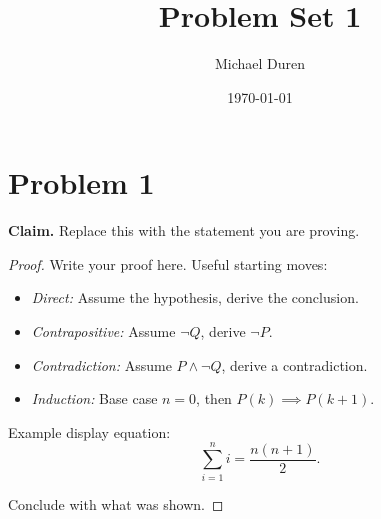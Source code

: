 \documentclass[11pt]{article}
\title{Problem Set 1}
\author{Michael Duren}
\date{\today}
\theoremstyle{definition}
\begin{document}
\maketitle

\section*{Problem 1}

\textbf{Claim.} Replace this with the statement you are proving.

\begin{proof}
  Write your proof here. Useful starting moves:
  \begin{itemize}
    \item \emph{Direct:} Assume the hypothesis, derive the conclusion.
    \item \emph{Contrapositive:} Assume $\neg Q$, derive $\neg P$.
    \item \emph{Contradiction:} Assume $P \land \neg Q$, derive a contradiction.
    \item \emph{Induction:} Base case $n = 0$, then $P(k) \implies P(k+1)$.
  \end{itemize}

  Example display equation:
  \[
    \sum_{i=1}^{n} i = \frac{n(n+1)}{2}.
  \]

  Conclude with what was shown. \qedhere
\end{proof}
\end{document}
